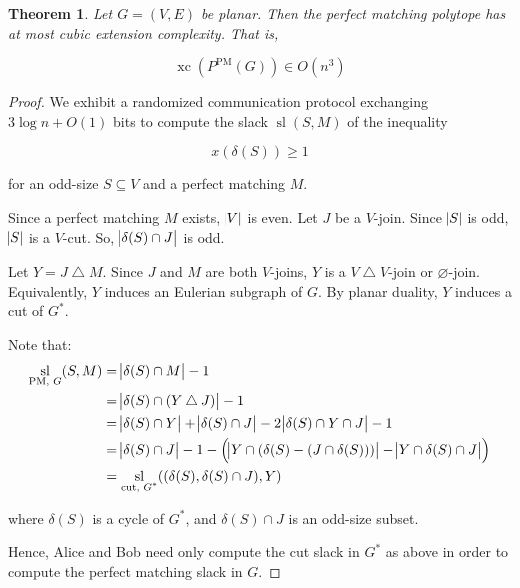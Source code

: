 \documentclass{article}
\newtheorem{theorem}{Theorem}
\DeclareMathOperator{\xc}{xc}
\DeclareMathOperator{\Sl}{sl}
\begin{document}
\begin{theorem}
	Let $G=(V,E)$ be planar. Then the perfect matching polytope has
	at most cubic extension complexity. That is,

	$$\xc(P^{\text{PM}}(G)) \in O(n^3)$$
\end{theorem}
\begin{proof}
	We exhibit a randomized communication protocol exchanging $3\log n+O(1)$
	bits to compute the slack $\Sl(S, M)$ of the inequality
	
	$$ x(\delta(S)) \geq 1$$

	for an odd-size $S\subseteq V$ and a perfect matching $M$.

	Since a perfect matching $M$ exists, $\abs{V}$ is even.
	Let $J$ be a $V$-join. Since $\abs{S}$ is odd, 
	$\abs{S}$ is a $V$-cut. 
	So, $\abs{\delta(S)\cap J}$ is odd.

	Let $Y = J\bigtriangleup M$. Since $J$ and $M$ are both $V$-joins,
	$Y$ is a $V\bigtriangleup V$-join or $\varnothing$-join.
	Equivalently, $Y$ induces an Eulerian subgraph of $G$.
	By planar duality, $Y$ induces a cut of $G^*$.

	Note that:
	\begin{align*}
		\Sl_\text{PM, $G$}(S, M) &= \abs{\delta(S)\cap M} - 1 \\
		&= \abs{\delta(S)\cap (Y \bigtriangleup J)} - 1 \\
		&= \abs{\delta(S)\cap Y} + \abs{\delta(S)\cap J} - 2\abs{\delta(S)\cap Y \cap J} - 1 \\
		&= \abs{\delta(S)\cap J} - 1 - \del{\abs{Y\cap(\delta(S)-(J\cap\delta(S)))} - \abs{Y\cap\delta(S)\cap J}} \\
		&= \Sl_\text{cut, $G^*$}((\delta(S), \delta(S)\cap J), Y) 
	\end{align*}

	where $\delta(S)$ is a cycle of $G^*$,
	and $\delta(S)\cap J$ is an odd-size subset.

	Hence, Alice and Bob need only compute the cut slack in $G^*$ as above
	in order to compute the perfect matching slack in $G$.
\end{proof}
\end{document}
